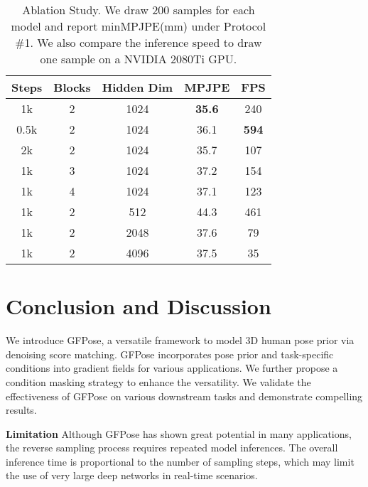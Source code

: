 \documentclass[10pt,twocolumn,letterpaper]{article}
\begin{document}
\begin{table}
    \centering
    \small
\setlength{\tabcolsep}{0.35cm}
        \begin{tabular}{c c c c c}
            \toprule
            Steps & Blocks & Hidden Dim & MPJPE & FPS  \\
            \midrule
            1k & 2 & 1024 & \textbf{35.6} & 240 \\
            \hline
            0.5k & 2 & 1024 & 36.1 & \textbf{594} \\
            2k & 2 & 1024 & 35.7 & 107\\
            1k & 3 & 1024 & 37.2 & 154\\
            1k & 4 & 1024 & 37.1 & 123 \\
            1k & 2& 512 & 44.3 & 461 \\
            1k & 2& 2048  & 37.6 & 79 \\
            1k & 2& 4096  & 37.5 & 35 \\
            \bottomrule
        \end{tabular}
\vspace{-0.5em}
    \caption{Ablation Study. We draw 200 samples for each model and report minMPJPE(mm) under Protocol \#1. We also compare the inference speed to draw one sample on a NVIDIA 2080Ti GPU.}
    \label{table:ablation}
    \vspace{-1.0em}
\end{table}







 
\section{Conclusion and Discussion}
\label{sec:conclusion}

We introduce GFPose, a versatile framework to model 3D human pose prior via denoising score matching. GFPose incorporates pose prior and task-specific conditions into gradient fields for various applications. We further propose a condition masking strategy to enhance the versatility. We validate the effectiveness of GFPose on various downstream tasks and demonstrate compelling results.

\noindent\textbf{Limitation} Although GFPose has shown great potential in many applications, the reverse sampling process requires repeated model inferences. The overall inference time is proportional to the number of sampling steps,
which may limit the use of very large deep networks in real-time scenarios.
\end{document}
